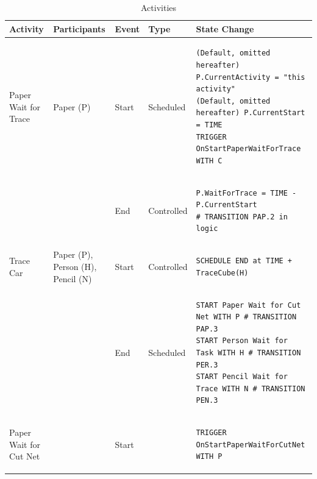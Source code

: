 \documentclass[
  10pt,
  a4paperpaper,
  DIV=11,
  numbers=noendperiod,
  oneside]{scrreprt}
\begin{document}
\begin{longtable}{@{}>{\raggedright\arraybackslash}p{1.8cm}>{\raggedright\arraybackslash}p{2.1cm}>{\raggedright\arraybackslash}p{0.9cm}>{\raggedright\arraybackslash}p{2.2cm}>{\raggedright\arraybackslash}p{8.75cm}@{}}

\caption{\label{tbl-activities_pc}Activities}

\tabularnewline

  \toprule
  Activity                                   & Participants                                             & Event & Type       & State Change \\ \midrule
  \endhead
  Paper Wait for Trace      & Paper (P)                            & Start & Scheduled  & 
\begin{lstlisting}[language=CMPseudo]
(Default, omitted hereafter) P.CurrentActivity = "this activity"
(Default, omitted hereafter) P.CurrentStart = TIME
TRIGGER OnStartPaperWaitForTrace WITH C
\end{lstlisting}             \\
                                             &                                                          & End   & Controlled &
  \begin{lstlisting}[language=CMPseudo]
P.WaitForTrace = TIME - P.CurrentStart
# TRANSITION PAP.2 in logic
  \end{lstlisting}              \\ \midrule
  Trace Car                 & Paper (P), Person (H), Pencil (N)       & Start & Controlled &  
\begin{lstlisting}[language=CMPseudo]
SCHEDULE END at TIME + TraceCube(H)
\end{lstlisting}              \\
                                             &                                                          & End   & Scheduled  & 
\begin{lstlisting}[language=CMPseudo]
START Paper Wait for Cut Net WITH P # TRANSITION PAP.3
START Person Wait for Task WITH H # TRANSITION PER.3
START Pencil Wait for Trace WITH N # TRANSITION PEN.3
\end{lstlisting}              \\ \midrule
  Paper Wait for Cut Net    &                                & Start &   & 
\begin{lstlisting}[language=CMPseudo]
TRIGGER OnStartPaperWaitForCutNet WITH P
\end{lstlisting}              \\

\end{longtable}
\end{document}

